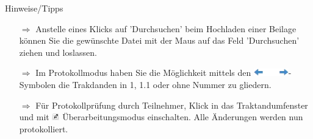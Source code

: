 \documentclass{article}
\begin{document}
\begin{beamerlikethm}{Hinweise/Tipps}
\begin{itemize}
  \item[$\Longrightarrow$] Anstelle eines Klicks auf 'Durchsuchen' beim Hochladen einer Beilage  können Sie die gewünschte Datei mit der Maus auf das Feld 'Durchsuchen' ziehen und loslassen.
  \item[$\Longrightarrow$] Im Protokollmodus haben Sie die Möglichkeit mittels den \includegraphics[height=9pt]{Icons/Pfeil-links-rechts.png}-Symbolen die Trakdanden in 1, 1.1 oder ohne Nummer zu gliedern.
	\item[$\Longrightarrow$] Für  Protokollprüfung durch Teilnehmer, Klick in das Traktandumfenster und mit \includegraphics[height=9pt]{Icons/UeberarbModus.jpg} Überarbeitungsmodus einschalten. Alle Änderungen werden nun protokolliert.
\end{itemize}
\end{beamerlikethm}

	
	


\pagebreak


\vspace{\baselineskip}

\end{document}
